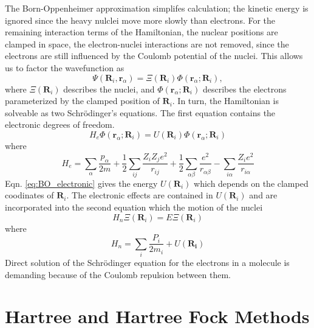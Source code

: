 The Born-Oppenheimer approximation\cite{born1927_bo} simplifes calculation; the kinetic energy is ignored since the heavy nulclei move more slowly than electrons.  For the remaining interaction terms of the Hamiltonian, the nuclear positions are clamped in space, the electron-nuclei interactions are not removed, since the electrons are still influenced by the Coulomb potential of the nuclei.  This allows us to factor the wavefunction as
\begin{equation}
	\Psi(\bm{R}_i,\bm{r}_\alpha) = \Xi(\bm{R}_i)\Phi(\bm{r}_\alpha;\bm{R}_i),
\end{equation}
where $\Xi(\bm{R}_i)$ describes the nuclei, and $\Phi(\bm{r}_\alpha;\bm{R}_i)$ describes the electrons parameterized by the clamped position of $\bm{R}_i$.  In turn, the Hamiltonian is solveable as two Schr\"{o}dinger's equations.  The first equation contains the electronic degrees of freedom.
\begin{equation}
\label{eq:BO_electronic}
     H_{e}\Phi(\bm{r}_\alpha;\bm{R}_i)=U(\bm{R}_i)\Phi(\bm{r}_\alpha;\bm{R}_i)
\end{equation}
where
\begin{equation}
	H_e = \sum_\alpha \frac{p_\alpha}{2m}
	      + \frac{1}{2} \sum_{ij} \frac{Z_i Z_j e^2}{r_{ij}}
	      + \frac{1}{2} \sum_{\alpha\beta} \frac{e^2}{r_{\alpha\beta}}
	      - \sum_{i\alpha} \frac{Z_i e^2}{r_{i\alpha}}
\end{equation}
Eqn. \ref{eq:BO_electronic} gives the energy $U(\bm{R}_i)$ which depends on the clamped coodinates of $\bm{R}_i$.  The electronic effects are contained in $U(\bm{R}_i)$ and are incorporated into the second equation which the motion of the nuclei
\begin{equation}
\label{eq:BO_nuclei}
    H_n\Xi(\bm{R}_i)=E\Xi(\bm{R}_i)
\end{equation}
where
\begin{equation}
\label{eq:H_n}
    H_n = \sum_i \frac{P_i}{2m_i} + U(\bm{R_i})
\end{equation}
Direct solution of the Schr{\"o}dinger equation for the electrons in a molecule is demanding because of the Coulomb repulsion between them.

\section{Hartree and Hartree Fock Methods}

